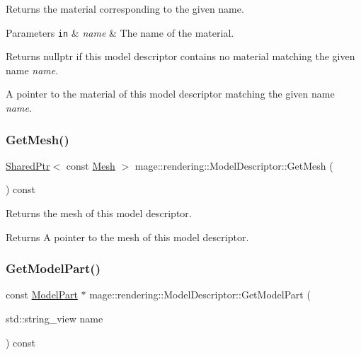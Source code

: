 Returns the material corresponding to the given name.


\begin{DoxyParams}[1]{Parameters}
\mbox{\tt in}  & {\em name} & The name of the material. \\
\hline
\end{DoxyParams}
\begin{DoxyReturn}{Returns}
{\ttfamily nullptr} if this model descriptor contains no material matching the given name {\itshape name}. 

A pointer to the material of this model descriptor matching the given name {\itshape name}. 
\end{DoxyReturn}
\mbox{\label{classmage_1_1rendering_1_1_model_descriptor_a65645313d8b7bb976d1b5d0acdbbd38a}} 
\subsubsection{\texorpdfstring{Get\+Mesh()}{GetMesh()}}
{\footnotesize\ttfamily \mbox{\hyperlink{namespacemage_a1e01ae66713838a7a67d30e44c67703e}{Shared\+Ptr}}$<$ const \mbox{\hyperlink{classmage_1_1rendering_1_1_mesh}{Mesh}} $>$ mage\+::rendering\+::\+Model\+Descriptor\+::\+Get\+Mesh (\begin{DoxyParamCaption}{ }\end{DoxyParamCaption}) const\hspace{0.3cm}{\ttfamily [noexcept]}}

Returns the mesh of this model descriptor.

\begin{DoxyReturn}{Returns}
A pointer to the mesh of this model descriptor. 
\end{DoxyReturn}
\mbox{\label{classmage_1_1rendering_1_1_model_descriptor_a3a10002efd6bfdc701f5fc27c54d441f}} 
\subsubsection{\texorpdfstring{Get\+Model\+Part()}{GetModelPart()}}
{\footnotesize\ttfamily const \mbox{\hyperlink{structmage_1_1rendering_1_1_model_part}{Model\+Part}} $\ast$ mage\+::rendering\+::\+Model\+Descriptor\+::\+Get\+Model\+Part (\begin{DoxyParamCaption}\item[{std\+::string\+\_\+view}]{name }\end{DoxyParamCaption}) const\hspace{0.3cm}{\ttfamily [noexcept]}}

